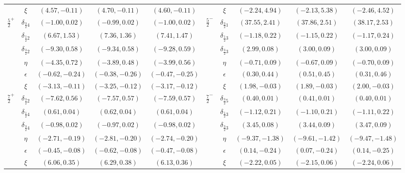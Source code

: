 \documentclass[11pt]{article}
\begin{document}
\begin{table}[htbp]
{\begin{tabular}{ c c c c c | c c c c c }
            & $\xi$ & $(4.57,-0.11)$ & $(4.70,-0.11)$ & $(4.60,-0.11)$ & & $\xi$ & $(-2.24,4.94)$ & $(-2.13,5.38)$ & $(-2.46,4.52)$ \\
            $\frac{5}{2}^+$ & $\delta_{\frac{3}{2}4}$ & $(-1.00,0.02)$ & $(-0.99,0.02)$ & $(-1.00,0.02)$ & $\frac{5}{2}^-$ & $\delta_{\frac{3}{2}1}$ & $(37.55,2.41)$ & $(37.86,2.51)$ & $(38.17,2.53)$ \\
            & $\delta_{\frac{1}{2}2}$ & $(6.67,1.53)$ & $(7.36,1.36)$ & $(7.41,1.47)$ & & $\delta_{\frac{1}{2}3}$ & $(-1.18,0.22)$ & $(-1.15,0.22)$ & $(-1.17,0.24)$ \\
            & $\delta_{\frac{3}{2}2}$ & $(-9.30,0.58)$ & $(-9.34,0.58)$ & $(-9.28,0.59)$ & & $\delta_{\frac{3}{2}3}$ & $(2.99,0.08)$ & $(3.00,0.09)$ & $(3.00,0.09)$ \\
            & $\eta$ & $(-4.35,0.72)$ & $(-3.89,0.48)$ & $(-3.99,0.56)$ & & $\eta$ & $(-0.71,0.09)$ & $(-0.67,0.09)$ & $(-0.70,0.09)$ \\
            & $\epsilon$ & $(-0.62,-0.24)$ & $(-0.38,-0.26)$ & $(-0.47,-0.25)$ & & $\epsilon$ & $(0.30,0.44)$ & $(0.51,0.45)$ & $(0.31,0.46)$ \\
            & $\xi$ & $(-3.13,-0.11)$ & $(-3.25,-0.12)$ & $(-3.17,-0.12)$ & & $\xi$ & $(1.98,-0.03)$ & $(1.89,-0.03)$ & $(2.00,-0.03)$ \\
            $\frac{7}{2}^+$ & $\delta_{\frac{3}{2}2}$ & $(-7.62,0.56)$ & $(-7.57,0.57)$ & $(-7.59,0.57)$ & $\frac{7}{2}^-$ & $\delta_{\frac{3}{2}5}$ & $(0.40,0.01)$ & $(0.41,0.01)$ & $(0.40,0.01)$ \\
            & $\delta_{\frac{1}{2}4}$ & $(0.61,0.04)$ & $(0.62,0.04)$ & $(0.61,0.04)$ & & $\delta_{\frac{1}{2}3}$ & $(-1.12,0.21)$ & $(-1.10,0.21)$ & $(-1.11,0.22)$ \\
            & $\delta_{\frac{3}{2}4}$ & $(-0.98,0.02)$ & $(-0.97,0.02)$ & $(-0.98,0.02)$ & & $\delta_{\frac{3}{2}3}$ & $(3.45,0.08)$ & $(3.44,0.09)$ & $(3.47,0.09)$ \\
            & $\eta$ & $(-2.71,-0.19)$ & $(-2.81,-0.20)$ & $(-2.74,-0.20)$ & & $\eta$ & $(-9.37,-1.38)$ & $(-9.61,-1.42)$ & $(-9.47,-1.48)$ \\
            & $\epsilon$ & $(-0.45,-0.08)$ & $(-0.62,-0.08)$ & $(-0.47,-0.08)$ & & $\epsilon$ & $(0.14,-0.24)$ & $(0.07,-0.24)$ & $(0.14,-0.25)$ \\
            & $\xi$ & $(6.06,0.35)$ & $(6.29,0.38)$ & $(6.13,0.36)$ & & $\xi$ & $(-2.22,0.05)$ & $(-2.15,0.06)$ & $(-2.24,0.06)$ \\
            \hline\hline
        \end{tabular}
}
\end{table}
\end{document}
